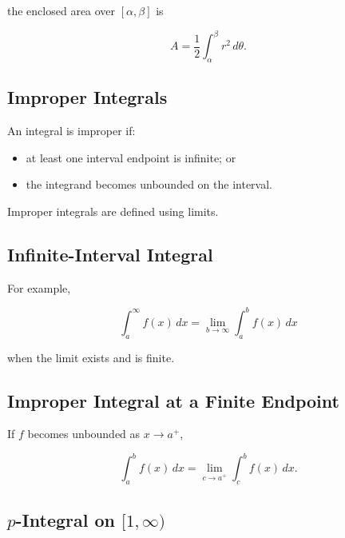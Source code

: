 the enclosed area over \([\alpha,\beta]\) is

\[
\boxed{
A
=
\frac12
\int_\alpha^\beta
r^2\,d\theta.
}
\]

\subsection{Improper Integrals}
\label{subsec:improper-integrals-reference}

An integral is improper if:

\begin{itemize}
    \item at least one interval endpoint is infinite; or
    \item the integrand becomes unbounded on the interval.
\end{itemize}

Improper integrals are defined using limits.

\subsection{Infinite-Interval Integral}
\label{subsec:infinite-interval-integral}

For example,

\[
\boxed{
\int_a^\infty
f(x)\,dx
=
\lim_{b\to\infty}
\int_a^b
f(x)\,dx
}
\]

when the limit exists and is finite.

\subsection{Improper Integral at a Finite Endpoint}
\label{subsec:finite-endpoint-improper-integral}

If \(f\) becomes unbounded as \(x\to a^+\),

\[
\boxed{
\int_a^b f(x)\,dx
=
\lim_{c\to a^+}
\int_c^b
f(x)\,dx.
}
\]

\subsection{\(p\)-Integral on \([1,\infty)\)}
\label{subsec:p-integral-infinity-reference}

